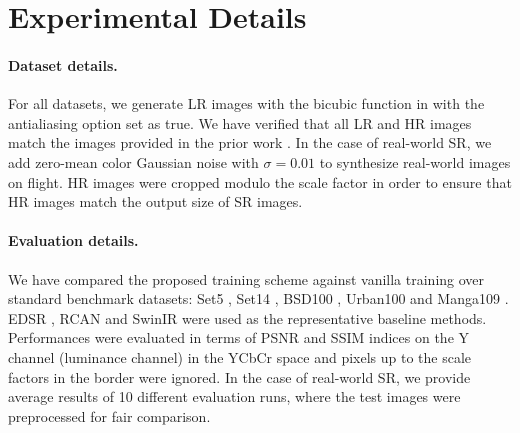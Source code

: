\section{Experimental Details\hfill\phantom{PLACEHOLDER}}

\paragraph{Dataset details.}
For all datasets,  we generate LR images with the bicubic function in  with the antialiasing option set as true. We have verified that all LR and HR images match the images provided in the prior work \cite{SISR2_EDSR}. In the case of real-world SR, we add zero-mean color Gaussian noise with $\sigma=0.01$ to synthesize real-world images on flight. HR images were cropped modulo the scale factor in order to ensure that HR images match the output size of SR images.


\paragraph{Evaluation details.}
We have compared the proposed training scheme against vanilla training over standard benchmark datasets: Set5 \cite{set5}, Set14 \cite{set14}, BSD100 \cite{bsd100}, Urban100 \cite{urban100} and Manga109 \cite{manga109}. EDSR \cite{SISR2_EDSR}, RCAN \cite{SISR4_RCAN} and SwinIR \cite{liang2021swinir} were used as the representative baseline methods. Performances were evaluated in terms of PSNR and SSIM indices on the Y channel (luminance channel) in the YCbCr space and pixels up to the scale factors in the border were ignored. In the case of real-world SR, we provide average results of 10 different evaluation runs, where the test images were preprocessed for fair comparison.



